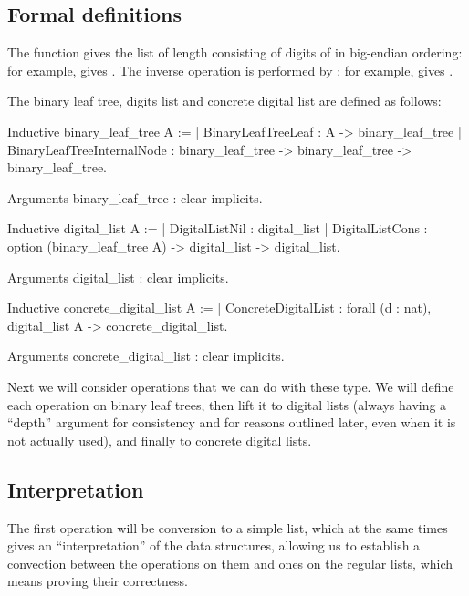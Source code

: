 \documentclass{article}
\begin{document}
\subsection{Formal definitions}

The function  gives the list of length  consisting of digits of  in big-endian ordering: for example,  gives \coqinline{[0; 1; 0; 0; 1; 0; 0; 1]}. The inverse operation is performed by : for example,  gives .

The binary leaf tree, digits list and concrete digital list are defined as follows:

\begin{coq}
Inductive binary_leaf_tree {A} :=
  | BinaryLeafTreeLeaf : A -> binary_leaf_tree
  | BinaryLeafTreeInternalNode : binary_leaf_tree -> binary_leaf_tree -> binary_leaf_tree.

Arguments binary_leaf_tree : clear implicits.

Inductive digital_list {A} :=
  | DigitalListNil : digital_list
  | DigitalListCons : option (binary_leaf_tree A) -> digital_list -> digital_list.

Arguments digital_list : clear implicits.

Inductive concrete_digital_list {A} :=
  | ConcreteDigitalList : forall (d : nat), digital_list A -> concrete_digital_list.

Arguments concrete_digital_list : clear implicits.
\end{coq}

Next we will consider operations that we can do with these type. We will define each operation on binary leaf trees, then lift it to digital lists (always having a ``depth'' argument for consistency and for reasons outlined later, even when it is not actually used), and finally to concrete digital lists.

\subsection{Interpretation}

The first operation will be conversion to a simple list, which at the same times gives an ``interpretation'' of the data structures, allowing us to establish a convection between the operations on them and ones on the regular lists, which means proving their correctness.
\end{document}

